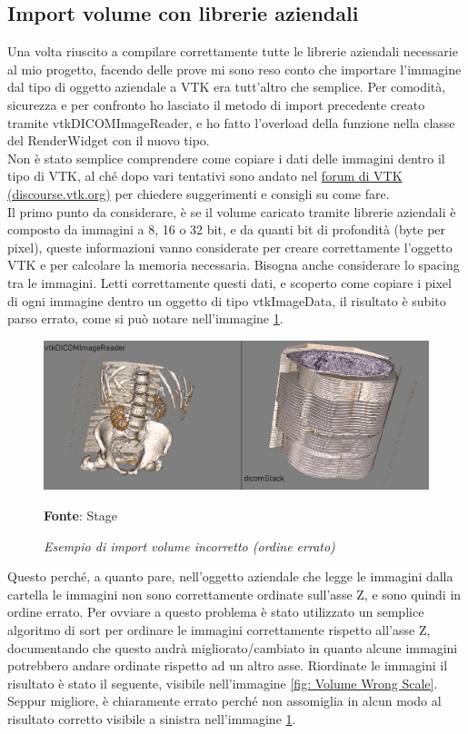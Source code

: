 \subsection{Import volume con librerie aziendali}
Una volta riuscito a compilare correttamente tutte le librerie aziendali necessarie al mio progetto, facendo delle prove mi sono reso conto che importare l'immagine dal tipo di oggetto aziendale a VTK era tutt'altro che semplice. Per comodità, sicurezza e per confronto ho lasciato il metodo di import precedente creato tramite vtkDICOMImageReader, e ho fatto l'overload della funzione nella classe del RenderWidget con il nuovo tipo.
\\
Non è stato semplice comprendere come copiare i dati delle immagini dentro il tipo di VTK, al ché dopo vari tentativi sono andato nel \href{https://discourse.vtk.org/t/trying-to-load-custom-loaded-images-into-vtkimageimport/3704}{forum di VTK (discourse.vtk.org)} per chiedere suggerimenti e consigli su come fare.
\\
Il primo punto da considerare, è se il volume caricato tramite librerie aziendali è composto da immagini a 8, 16 o 32 bit, e da quanti bit di profondità (byte per pixel), queste informazioni vanno considerate per creare correttamente l'oggetto VTK e per calcolare la memoria necessaria. Bisogna anche considerare lo spacing tra le immagini. Letti correttamente questi dati, e scoperto come copiare i pixel di ogni immagine dentro un oggetto di tipo vtkImageData, il risultato è subito parso errato, come si può notare nell'immagine \ref{fig: Volume Wrong Order}.

\begin{figure}[h]
    \centering
    \includegraphics[width=1\textwidth]{immagini/svolgimento/volumebrokenorder.jpg}
    \caption{\textit{Esempio di import volume incorretto (ordine errato)}}
    \textbf{Fonte}: Stage
    \label{fig: Volume Wrong Order}
\end{figure}

Questo perché, a quanto pare, nell'oggetto aziendale che legge le immagini dalla cartella le immagini non sono correttamente ordinate sull'asse Z, e sono quindi in ordine errato. Per ovviare a questo problema è stato utilizzato un semplice algoritmo di sort per ordinare le immagini correttamente rispetto all'asse Z, documentando che questo andrà migliorato/cambiato in quanto alcune immagini potrebbero andare ordinate rispetto ad un altro asse. Riordinate le immagini il risultato è stato il seguente, visibile nell'immagine \ref{fig: Volume Wrong Scale}. Seppur migliore, è chiaramente errato perché non assomiglia in alcun modo al risultato corretto visibile a sinistra nell'immagine \ref{fig: Volume Wrong Order}.

